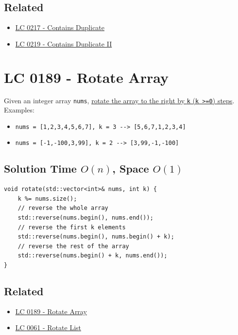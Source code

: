 \subsection*{Related}
\begin{itemize}
\item \hyperref[lc0217]{LC 0217 - Contains Duplicate}
\item \hyperref[lc0219]{LC 0219 - Contains Duplicate II}
\end{itemize}

\section{LC 0189 - Rotate Array}\label{lc0189}
Given an integer array {\colorbox{CodeBackground}{\lstinline|nums|}}, \ul{rotate the array to the right by {\colorbox{CodeBackground}{\lstinline|k|}} ({\colorbox{CodeBackground}{\lstinline|k >=0|}}) steps}.\\

Examples:
\begin{itemize}
	\item {\colorbox{CodeBackground}{\lstinline|nums = [1,2,3,4,5,6,7], k = 3 --> [5,6,7,1,2,3,4]|}}
	\item {\colorbox{CodeBackground}{\lstinline|nums = [-1,-100,3,99], k = 2 --> [3,99,-1,-100]|}}
\end{itemize}

\subsection*{Solution  {\scriptsize\color{gray}\Coffeecup\hspace{1mm}Time $O(n)$, Space $O(1)$}}
\begin{lstlisting}
void rotate(std::vector<int>& nums, int k) {
	k %= nums.size();
	// reverse the whole array
	std::reverse(nums.begin(), nums.end());
	// reverse the first k elements
	std::reverse(nums.begin(), nums.begin() + k);
	// reverse the rest of the array
	std::reverse(nums.begin() + k, nums.end());
}
\end{lstlisting}

\subsection*{Related}
\begin{itemize}
	\item \hyperref[lc0189]{LC 0189 - Rotate Array}
	\item \hyperref[lc0061]{LC 0061 - Rotate List}
\end{itemize}


